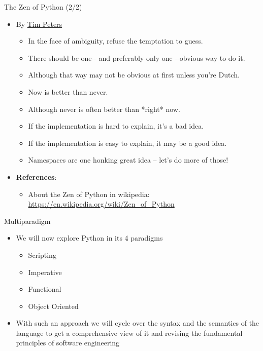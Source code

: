 \documentclass{beamer}
\begin{document}
\begin{frame}
{\centerline{The Zen of Python (2/2)}}
\begin{itemize}
    \item By \href{https://en.wikipedia.org/wiki/Zen_of_Python}{Tim Peters}
    \begin{itemize}
    \item In the face of ambiguity, refuse the temptation to guess.
    \item There should be one$\text{-}\text{-}$ and preferably only one $\text{-}\text{-}$obvious way to do it.
    \item Although that way may not be obvious at first unless you're Dutch.
    \item Now is better than never.
    \item Although never is often better than *right* now.
    \item If the implementation is hard to explain, it's a bad idea.
    \item If the implementation is easy to explain, it may be a good idea.
    \item Namespaces are one honking great idea – let's do more of those!
    \end{itemize} 
\end{itemize} 

{\tiny
{}
\begin{itemize}
\item \textbf{References}:
\begin{itemize}
\item About the Zen of Python in wikipedia: \url{https://en.wikipedia.org/wiki/Zen_of_Python}
\end{itemize}
\end{itemize}
}
\end{frame}

\begin{frame}
{\centerline{Multiparadigm}}
\begin{itemize}
    \item We will now explore Python in its 4 paradigms
    \begin{itemize}
    \item Scripting
    \item Imperative
    \item Functional
    \item Object Oriented
    \end{itemize} 
    \item With such an approach we will cycle over the syntax and the semantics of the language to get a comprehensive view of it and revising the fundamental principles of software engineering
\end{itemize} 
\end{frame}
\end{document}

